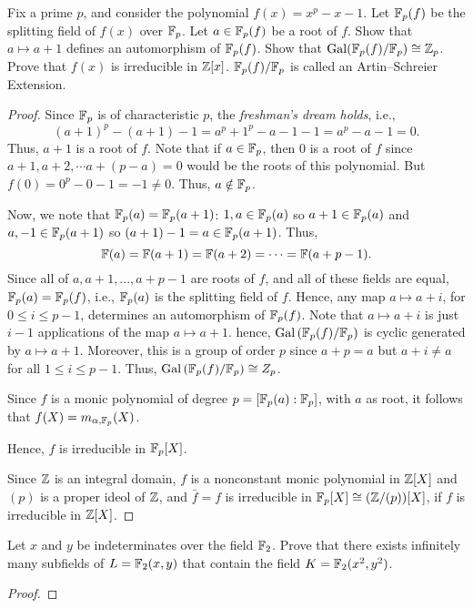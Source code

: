 \begin{problem}
Fix a prime $p$, and consider the polynomial $f(x)=x^p-x-1$. Let
$\mathbb{F}_p(f)$ be the splitting field of $f(x)$ over $\mathbb{F}_p$. Let
$a\in\mathbb{F}_p(f)$ be a root of $f$. Show that $a\mapsto a+1$ defines an
automorphism of $\mathbb{F}_p(f)$. Show that
$\operatorname{Gal}(\mathbb{F}_p(f)/\mathbb{F}_p)\cong\mathbb{Z}_p$. Prove that $f(x)$ is irreducible in
$\mathbb{Z}[x]$. $\mathbb{F}_p(f)/\mathbb{F}_p$ is called an Artin--Schreier Extension.
\end{problem}
\begin{proof}
Since $\mathbb{F}_p$ is of characteristic $p$, the \emph{freshman's dream holds},
i.e.,
\[
(a+1)^p-(a+1)-1=a^p+1^p-a-1-1=a^p-a-1=0.
\]
Thus, $a+1$ is a root of $f$. Note that if $a\in\mathbb{F}_p$, then $0$ is a root
of $f$ since $a+1,a+2,\cdots a+(p-a)=0$ would be the roots of this
polynomial. But $f(0)=0^p-0-1=-1\neq 0$. Thus, $a\notin\mathbb{F}_p$.

Now, we note that $\mathbb{F}_p(a)=\mathbb{F}_p(a+1)$: $1,a\in\mathbb{F}_p(a)$ so
$a+1\in\mathbb{F}_p(a)$ and $a,-1\in\mathbb{F}_p(a+1)$ so
$(a+1)-1=a\in\mathbb{F}_p(a+1)$. Thus,
\[
\mathbb{F}(a)=\mathbb{F}(a+1)=\mathbb{F}(a+2)=\cdots=\mathbb{F}(a+p-1).
\]
Since all of $a,a+1,...,a+p-1$ are roots of $f$, and all of these fields
are equal, $\mathbb{F}_p(a)=\mathbb{F}_p(f)$, i.e., $\mathbb{F}_p(a)$ is the splitting field
of $f$. Hence, any map $a\mapsto a+i$, for $0\leq i\leq p-1$, determines an
automorphism of $\mathbb{F}_p(f)$. Note that $a\mapsto a+i$ is just $i-1$
applications of the map $a\mapsto a+1$. hence,
$\operatorname{Gal}\left(\mathbb{F}_p(f)/\mathbb{F}_p\right)$ is cyclic generated by $a\mapsto
a+1$. Moreover, this is a group of order $p$ since $a+p=a$ but $a+i\neq a$
for all $1\leq i\leq p-1$. Thus, $\operatorname{Gal}\left(\mathbb{F}_p(f)/\mathbb{F}_p\right)\cong
Z_p$.

Since $f$ is a monic polynomial of degree
$p=\left[\mathbb{F}_p(a):\mathbb{F}_p\right]$, with $a$ as root, it follows that
$f(X)=m_{\alpha,\mathbb{F}_p}(X)$.

Hence, $f$ is irreducible in $\mathbb{F}_p[X]$.

Since $\mathbb{Z}$ is an integral domain, $f$ is a nonconstant monic polynomial
in $\mathbb{Z}[X]$ and $(p)$ is a proper ideol of $\mathbb{Z}$, and $\bar f=f$ is
irreducible in $\mathbb{F}_p[X]\cong(\mathbb{Z}/(p))[X]$, if $f$ is irreducible in
$\mathbb{Z}[X]$.
\end{proof}

\begin{problem}
Let $x$ and $y$ be indeterminates over the field $\mathbb{F}_2$. Prove that there
exists infinitely many subfields of $L=\mathbb{F}_2(x,y)$ that contain the field
$K=\mathbb{F}_2(x^2,y^2)$.
\end{problem}
\begin{proof}
\end{proof}

